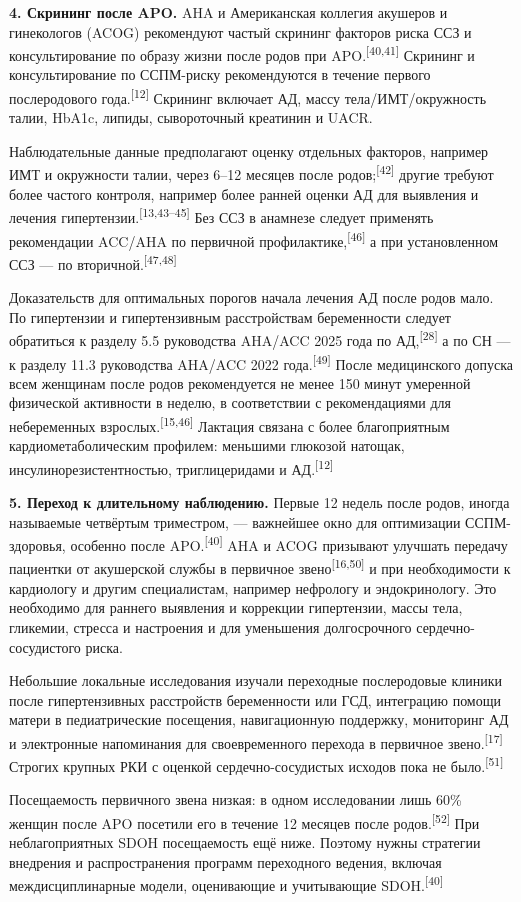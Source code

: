\documentclass[11pt,a4paper]{article}
\newcommand{\src}[1]{\textsuperscript{[#1]}}
\begin{document}
\textbf{4. Скрининг после APO.} AHA и Американская коллегия акушеров и гинекологов (ACOG) рекомендуют частый скрининг факторов риска ССЗ и консультирование по образу жизни после родов при APO.\src{40,41} Скрининг и консультирование по ССПМ-риску рекомендуются в течение первого послеродового года.\src{12} Скрининг включает АД, массу тела/ИМТ/окружность талии, HbA1c, липиды, сывороточный креатинин и UACR.

Наблюдательные данные предполагают оценку отдельных факторов, например ИМТ и окружности талии, через 6--12 месяцев после родов;\src{42} другие требуют более частого контроля, например более ранней оценки АД для выявления и лечения гипертензии.\src{13,43--45} Без ССЗ в анамнезе следует применять рекомендации ACC/AHA по первичной профилактике,\src{46} а при установленном ССЗ --- по вторичной.\src{47,48}

Доказательств для оптимальных порогов начала лечения АД после родов мало. По гипертензии и гипертензивным расстройствам беременности следует обратиться к разделу 5.5 руководства AHA/ACC 2025 года по АД,\src{28} а по СН --- к разделу 11.3 руководства AHA/ACC 2022 года.\src{49} После медицинского допуска всем женщинам после родов рекомендуется не менее 150 минут умеренной физической активности в неделю, в соответствии с рекомендациями для небеременных взрослых.\src{15,46} Лактация связана с более благоприятным кардиометаболическим профилем: меньшими глюкозой натощак, инсулинорезистентностью, триглицеридами и АД.\src{12}

\textbf{5. Переход к длительному наблюдению.} Первые 12 недель после родов, иногда называемые четвёртым триместром, --- важнейшее окно для оптимизации ССПМ-здоровья, особенно после APO.\src{40} AHA и ACOG призывают улучшать передачу пациентки от акушерской службы в первичное звено\src{16,50} и при необходимости к кардиологу и другим специалистам, например нефрологу и эндокринологу. Это необходимо для раннего выявления и коррекции гипертензии, массы тела, гликемии, стресса и настроения и для уменьшения долгосрочного сердечно-сосудистого риска.

Небольшие локальные исследования изучали переходные послеродовые клиники после гипертензивных расстройств беременности или ГСД, интеграцию помощи матери в педиатрические посещения, навигационную поддержку, мониторинг АД и электронные напоминания для своевременного перехода в первичное звено.\src{17} Строгих крупных РКИ с оценкой сердечно-сосудистых исходов пока не было.\src{51}

Посещаемость первичного звена низкая: в одном исследовании лишь 60\% женщин после APO посетили его в течение 12 месяцев после родов.\src{52} При неблагоприятных SDOH посещаемость ещё ниже. Поэтому нужны стратегии внедрения и распространения программ переходного ведения, включая междисциплинарные модели, оценивающие и учитывающие SDOH.\src{40}
\end{document}
